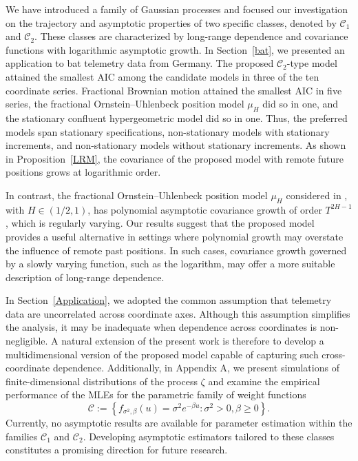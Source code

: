 \documentclass[preprint,12pt,authoryear]{elsarticle}
\begin{document}
We have introduced a family of Gaussian processes and focused our
investigation on the trajectory and asymptotic properties of two specific
classes, denoted by \(\mathcal{C}_1\) and \(\mathcal{C}_2\). These classes
are characterized by long-range dependence and covariance functions with
logarithmic asymptotic growth. In Section~\ref{bat}, we presented an
application to bat telemetry data from Germany. The proposed
\(\mathcal{C}_2\)-type model attained the smallest AIC among the candidate
models in three of the ten coordinate series. Fractional Brownian motion
attained the smallest AIC in five series, the fractional
Ornstein--Uhlenbeck position model \(\mu_H\) did so in one, and the
stationary confluent hypergeometric model did so in one. Thus, the
preferred models span stationary specifications, non-stationary models
with stationary increments, and non-stationary models without stationary
increments. As shown in Proposition~\ref{LRM}, the covariance of the
proposed model with remote future positions grows at logarithmic order.

In contrast, the fractional Ornstein--Uhlenbeck position model
\(\mu_H\) considered in \cite{JY}, with \(H\in(1/2,1)\), has polynomial
asymptotic covariance growth of order \(T^{2H-1}\), which is regularly
varying. Our results suggest that the proposed model provides a useful
alternative in settings where polynomial growth may overstate the
influence of remote past positions. In such cases, covariance growth
governed by a slowly varying function, such as the logarithm, may offer
a more suitable description of long-range dependence.

In Section~\ref{Application}, we adopted the common assumption that
telemetry data are uncorrelated across coordinate axes. Although this
assumption simplifies the analysis, it may be inadequate when dependence
across coordinates is non-negligible. A natural extension of the present
work is therefore to develop a multidimensional version of the proposed
model capable of capturing such cross-coordinate dependence.
Additionally, in Appendix A, we present simulations of finite-dimensional distributions of the process \(\zeta\) and examine the empirical performance of the MLEs for the parametric family of weight functions
\[
\mathcal{C}:=\left\{ f_{\sigma^2,\beta}(u)=\sigma^2e^{-\beta u} : \sigma^2>0,\beta\ge0 \right\}.
\]
Currently, no asymptotic results are available for parameter estimation within the families \(\mathcal{C}_1\) and \(\mathcal{C}_2\). Developing asymptotic estimators tailored to these classes constitutes a promising direction for future research.
\end{document}
